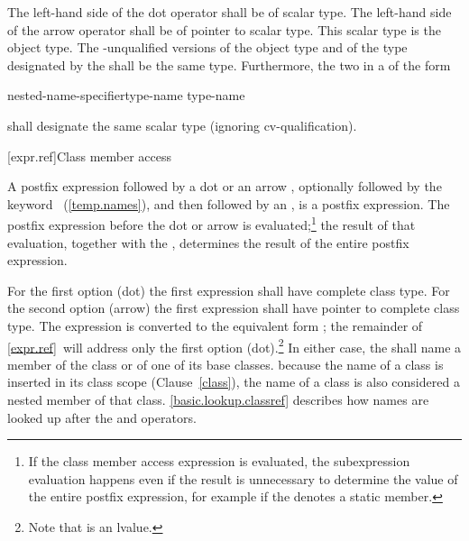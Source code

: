 \pnum
The left-hand side of the dot operator shall be of scalar type. The
left-hand side of the arrow operator shall be of pointer to scalar type.
This scalar type is the object type. The -unqualified
versions of the object type and of the type designated by the
 shall be the same type. Furthermore,
the two  in a  of
the form

\begin{ncbnf}
nested-name-specifier\opt type-name \terminal{::\,\tilde} type-name
\end{ncbnf}

shall designate the same scalar type (ignoring cv-qualification).

[expr.ref]{Class member access}

\pnum
{}%
%
%
%
%
%
%
%
%
%
A postfix expression followed by a dot  or an arrow \tcode{->},
optionally followed by the keyword
~(\ref{temp.names}), and then followed by an
, is a postfix expression. The postfix
expression before the dot or arrow is evaluated;\footnote{If the class member
access expression is evaluated, the subexpression evaluation happens even if the
result is unnecessary to determine
the value of the entire postfix expression, for example if the
 denotes a static member.}
the result of that evaluation, together with the
, determines the result of the entire postfix
expression.

\pnum
{}%
For the first option (dot) the first expression
shall have complete class type.
For the second option (arrow) the first expression
shall have pointer to complete class type. The expression  is
converted to the equivalent form ; the remainder of
\ref{expr.ref}~will address only the first option (dot).\footnote{Note that
 is an lvalue.}
In either case, the
 shall name a member of the class or of one of
its base classes.
\enternote 
because the name of a class is inserted in its class scope
(Clause~\ref{class}), the name of a class is also considered a nested
member of that class.
\exitnote 
\enternote
\ref{basic.lookup.classref} describes how names are looked up after the
 and \tcode{->} operators.
\exitnote 

